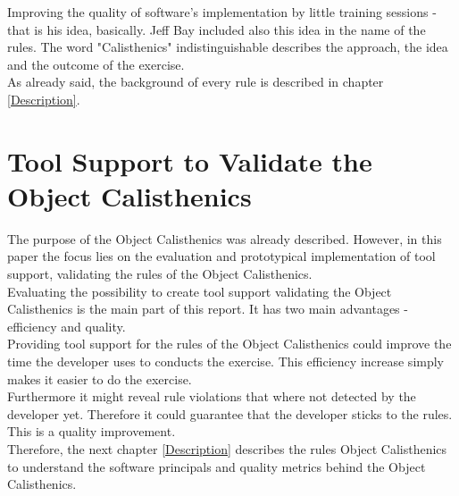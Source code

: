 Improving the quality of software's implementation by little training sessions - that is his idea, basically. Jeff Bay included also this idea in the name of the rules. The word "Calisthenics" indistinguishable describes the approach, the idea and the outcome of the exercise.\\

As already said, the background of every rule is described in chapter \ref{Description}.


\section{Tool Support to Validate the Object Calisthenics}



The purpose of the Object Calisthenics was already described. However, in this paper the focus lies on the evaluation and prototypical implementation of tool support, validating the rules of the Object Calisthenics. \\

Evaluating the possibility to create tool support validating the Object Calisthenics is the main part of this report. It has two main advantages - efficiency and quality.\\

Providing tool support for the rules of the Object Calisthenics could improve the time the developer uses to conducts the exercise. This efficiency increase simply makes it easier to do the exercise.\\

Furthermore it might reveal rule violations that where not detected by the developer yet. Therefore it could guarantee that the developer sticks to the rules. This is a quality improvement. \\

Therefore, the next chapter  \ref{Description} describes the rules Object Calisthenics to understand the software principals and quality metrics behind the Object Calisthenics. 

